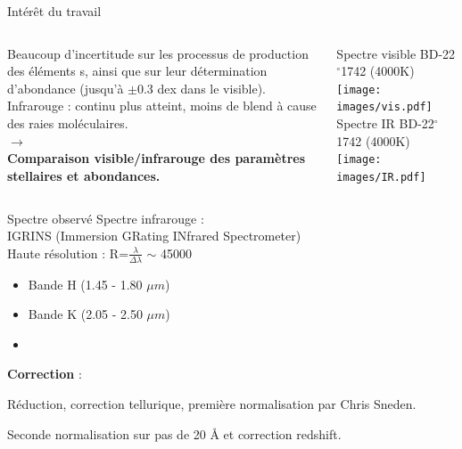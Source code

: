 \documentclass[10pt]{beamer}
\begin{document}
\begin{frame}[fragile]{Intérêt du travail}
    \begin{columns}
        \begin{column}{0.45\textwidth}
            Beaucoup d'incertitude sur les processus de production des éléments s, ainsi que sur leur détermination d'abondance (jusqu'à $\pm$0.3 dex dans le visible). \\
            \vspace{0.5cm}
            Infrarouge : continu plus atteint, moins de blend à cause des raies moléculaires. \\
            \vspace{0.5cm}
            \textbf{$\rightarrow$} \\
            \textbf{Comparaison visible/infrarouge des paramètres stellaires et abondances.}
        \end{column}  
        \begin{column}{0.55\textwidth}
            \begin{center}
            \footnotesize{Spectre visible BD-22$^{\circ}$1742 (4000K)}\\
            \texttt{[image: images/vis.pdf]}\\
            \footnotesize{Spectre IR BD-22$^{\circ}$1742 (4000K)}
            \texttt{[image: images/IR.pdf]}\\
            \end{center}
        \end{column}  
    \end{columns}
\end{frame}

\begin{frame}[fragile]{Spectre observé}
             Spectre infrarouge : \\
             IGRINS (Immersion GRating INfrared Spectrometer) \\ 
             Haute résolution : R=$\frac{\lambda}{\Delta \lambda}$ $\sim$ 45000 \\
    					\begin{itemize}
    						\item Bande H (1.45 - 1.80 $\mu m$)
    						\item Bande K (2.05 - 2.50 $\mu m$)
    						\item[]
    					\end{itemize}
        \vfill
        \textbf{Correction} : 

        Réduction, correction tellurique, première normalisation par Chris Sneden. 
        
        Seconde normalisation sur pas de 20 Å et correction redshift. \\
\end{frame}
\end{document}

